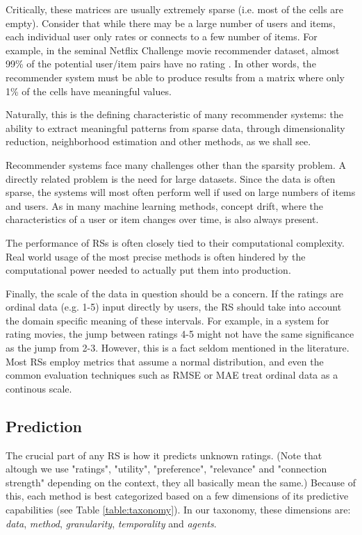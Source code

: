 Critically, these matrices are usually extremely sparse (i.e. most of the cells are empty). 
Consider that while there may be a large number of users and items, each individual user
only rates or connects to a few number of items. 
For example, in the seminal Netflix Challenge movie recommender dataset, almost 99\% of the potential
user/item pairs have no rating \citep[p1]{Bell2007d}. In other words, the recommender system must be able
to produce results from a matrix where only 1\% of the cells have meaningful values.

Naturally, this is the defining characteristic of 
many recommender systems: the ability to extract meaningful patterns from sparse data, 
through dimensionality reduction, neighborhood estimation and other methods, as we shall see.

Recommender systems face many challenges other than the sparsity problem.
A directly related problem is the need for large datasets. Since the data is often sparse,
the systems will most often perform well if used on large numbers of items and users.
As in many machine learning methods, concept drift, where the characteristics of a user or item
changes over time, is also always present.

The performance of RSs is often closely tied to their computational complexity. 
Real world usage of the most precise methods is often hindered by the computational power
needed to actually put them into production.

Finally, the scale of the data in question should be a concern. If the ratings are ordinal data (e.g. 1-5)
input directly by users, the RS should take into account the domain specific meaning of these intervals.
For example, in a system for rating movies, the jump between ratings 4-5 might not have the same significance as
the jump from 2-3. However, this is a fact seldom mentioned in the literature. Most RSs 
employ metrics that assume a normal distribution, and even the common
evaluation techniques such as RMSE or MAE treat ordinal data as a continous scale. 


\subsection{Prediction}

The crucial part of any RS is how it predicts unknown ratings.
(Note that altough we use "ratings", "utility", "preference", "relevance" and "connection strength" depending on the context, they all basically mean the same.)
Because of this, each method is best categorized based on a few dimensions of its predictive capabilities (see Table \ref{table:taxonomy}).
In our taxonomy, these dimensions are: \emph{data}, \emph{method}, \emph{granularity}, \emph{temporality} and \emph{agents}.

